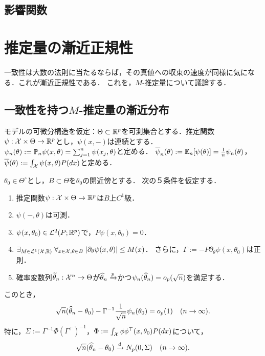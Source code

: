 \documentclass[uplatex,dvipdfmx]{jsreport}
\begin{document}
\subsection{影響関数}

\begin{theorem}
    
\end{theorem}

\section{推定量の漸近正規性}

\begin{tcolorbox}[colframe=ForestGreen, colback=ForestGreen!10!white,breakable,colbacktitle=ForestGreen!40!white,coltitle=black,fonttitle=\bfseries\sffamily,
title=]
    一致性は大数の法則に当たるならば，その真値への収束の速度が同様に気になる．これが漸近正規性である．
    これを，$M$-推定量について議論する．
\end{tcolorbox}

\subsection{一致性を持つ$M$-推定量の漸近分布}

\begin{notation}
    モデルの可微分構造を仮定：$\Theta\subset\mathbb{R}^p$を可測集合とする．推定関数$\psi:\mathcal{X}\times\Theta\to\mathbb{R}^p$とし，$\psi(x,-)$は連続とする．
    $\psi_n(\theta):=\mathbb{P}_n\psi(x,\theta)=\sum_{j=1}^n\psi(x_j,\theta)$と定める．
    $\overline{\psi}_n(\theta):=\mathbb{E}_n[\psi(\theta)]=\frac{1}{n}\psi_n(\theta)$，
    $\overline{\psi}(\theta):=\int_{\mathcal{X}}\psi(x,\theta)P(dx)$と定める．
\end{notation}

\begin{theorem}[漸近正規性の十分条件]\label{thm-asymptotic-normality}
    $\theta_0\in\Theta^\circ$とし，$B\subset\Theta$を$\theta_0$の開近傍とする．
    次の５条件を仮定する．
    \begin{enumerate}[({E}1)]
        \item 推定関数$\psi:\mathcal{X}\times\Theta\to\mathbb{R}^p$は$B$上$C^1$級．
        \item $\psi(-,\theta)$は可測．
        \item $\psi(x,\theta_0)\in\mathcal{L}^2(P;\mathbb{R}^p)$で，$P\psi(x,\theta_0)=0$．
        \item $\exists_{M\in\mathcal{L}^1(\mathcal{X},\mathbb{R})}\;\forall_{x\in\mathcal{X},\theta\in B}\;\lvert\partial_\theta\psi(x,\theta)\rvert\leq M(x)$．
        さらに，$\Gamma:=-P\partial_\theta\psi(x,\theta_0)$は正則．
        \item 確率変数列$\widetilde{\theta}_n:\mathcal{X}^n\to\Theta$が$\widehat{\theta}_n\xrightarrow{p}$かつ$\psi_n(\widehat{\theta}_n)=o_p(\sqrt{n})$を満足する．
    \end{enumerate}
    このとき，
    \[\sqrt{n}(\widehat{\theta}_n-\theta_0)-\Gamma^{-1}\frac{1}{\sqrt{n}}\psi_n(\theta_0)=o_p(1)\quad(n\to\infty).\]
    特に，$\Sigma:=\Gamma^{-1}\Phi(\Gamma^{\top})^{-1}$，$\Phi:=\int_{\mathcal{X}}\phi\phi^{\top}(x,\theta_0)P(dx)$について，
    \[\sqrt{n}(\widehat{\theta}_n-\theta_0)\xrightarrow{d}N_p(0,\Sigma)\quad(n\to\infty).\]
\end{theorem}
\end{document}
